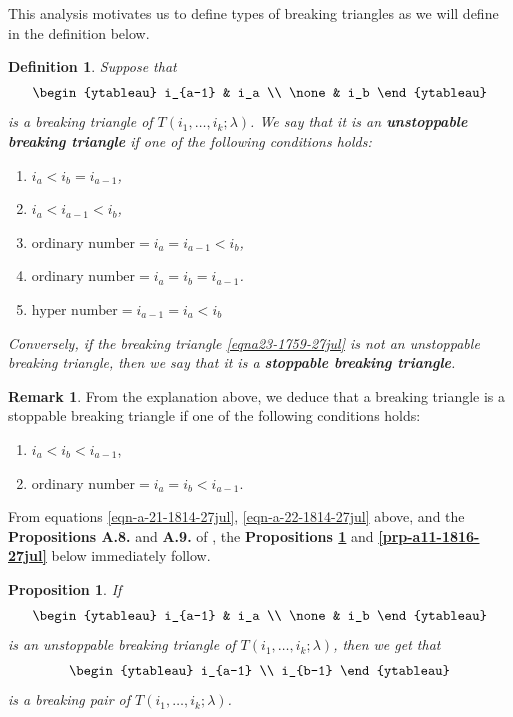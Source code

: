 \documentclass[12pt,reqno,a4paper]{amsart}
\numberwithin{equation}{section}
\newtheorem{prop}[thm]{Proposition}
\newtheorem{dfn}[thm]{Definition}
\theoremstyle{definition}
\newtheorem{rem}[thm]{Remark}
\begin{document}
This analysis motivates us to define types of breaking triangles as we will define in the definition below. 

\begin{dfn}
Suppose that 
\begin{align}
	\begin{ytableau}
		i_{a-1} & i_a
		\\
		\none & i_b
	\end{ytableau}
\label{eqna23-1759-27jul}
\end{align}
is a breaking triangle of $T(i_1,\dots,i_k;\lambda)$. We say that it is an \textbf{unstoppable breaking triangle} if one of the following conditions holds:
\begin{enumerate}[(1)]
	\item 	$i_a< i_b = i_{a-1}$,
	\item  $i_a < i_{a-1} < i_b$,
	\item  $\text{ordinary number} = i_a = i_{a-1} < i_b$,
	\item  $\text{ordinary number} = i_a = i_b = i_{a-1}$.
	\item $\text{hyper number} = i_{a-1} = i_a < i_b$
\end{enumerate}
Conversely, if the breaking triangle \eqref{eqna23-1759-27jul} is not an unstoppable breaking triangle, then we say that it is a \textbf{stoppable breaking triangle}.
\end{dfn}

\begin{rem}
From the explanation above, we deduce that a breaking triangle is a stoppable breaking triangle if one of the following conditions holds:
\begin{enumerate}[(1)]
	\item	$i_a < i_b < i_{a-1}$,
	\item  $\text{ordinary number} = i_a = i_b < i_{a-1}$. 
\end{enumerate}
\end{rem}

From equations \eqref{eqn-a-21-1814-27jul}, \eqref{eqn-a-22-1814-27jul} above, and the \textbf{Propositions A.8.} and \textbf{A.9.} of \cite{CSW2025}, 
the \textbf{Propositions \ref{prp-a10-1816-27jul}} and \textbf{\ref{prp-a11-1816-27jul}} below immediately follow.

\begin{prop}
\label{prp-a10-1816-27jul}
If 
\begin{align}
	\begin{ytableau}
		i_{a-1} & i_a
		\\
		\none & i_b
	\end{ytableau}
\end{align}
is an unstoppable breaking triangle of $T(i_1,\dots,i_k;\lambda)$, then we get that 
\begin{align}
	\begin{ytableau}
		i_{a-1}
		\\
		i_{b-1}
	\end{ytableau} 
\end{align}
is a breaking pair of $T(i_1,\dots,i_k;\lambda)$. 
\end{prop}
\end{document}
